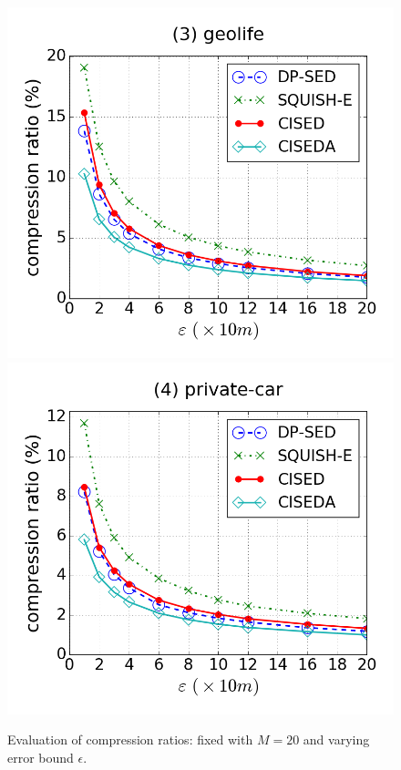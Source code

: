 \begin{figure}[tb!]
\includegraphics[scale = 0.250]{figures/Exp-cr-epsilon-geolife.png}
\includegraphics[scale = 0.250]{figures/Exp-cr-epsilon-private.png}
\vspace{-2ex}
\caption{\small Evaluation of compression ratios: fixed with $M=20$ and varying error bound $\epsilon$.}
\label{fig:cr-m20}
\vspace{-2.0ex}
\end{figure}


